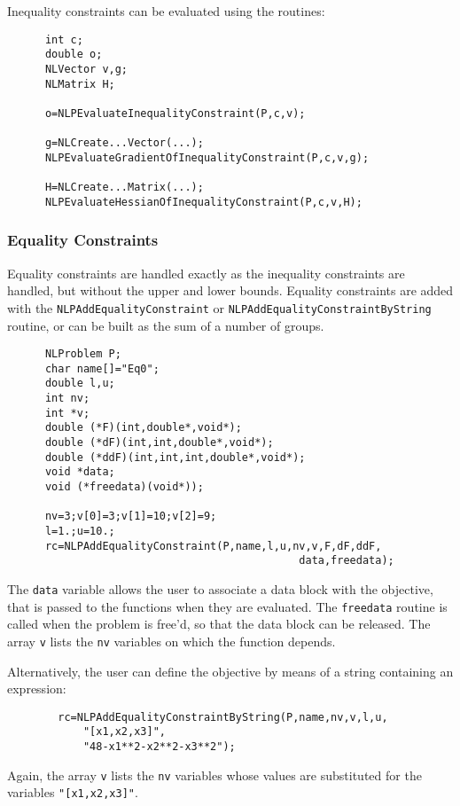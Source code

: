 \documentclass[12pt]{article}
\begin{document}
     Inequality constraints can be evaluated using the routines:
     \begin{verbatim}
      int c;
      double o;
      NLVector v,g;
      NLMatrix H;

      o=NLPEvaluateInequalityConstraint(P,c,v);

      g=NLCreate...Vector(...);
      NLPEvaluateGradientOfInequalityConstraint(P,c,v,g);

      H=NLCreate...Matrix(...);
      NLPEvaluateHessianOfInequalityConstraint(P,c,v,H);
     \end{verbatim}

   \subsubsection{Equality Constraints}
     Equality constraints are handled exactly as the inequality constraints are handled, but without the
     upper and lower bounds. Equality constraints are added with the {\tt NLPAdd\-Equality\-Constraint}
     or {\tt NLPAdd\-Equality\-Constraint\-ByString} routine, or can be built as the sum of a number of groups.
     \begin{verbatim}
      NLProblem P;
      char name[]="Eq0";
      double l,u;
      int nv;
      int *v;
      double (*F)(int,double*,void*);
      double (*dF)(int,int,double*,void*);
      double (*ddF)(int,int,int,double*,void*);
      void *data;
      void (*freedata)(void*));

      nv=3;v[0]=3;v[1]=10;v[2]=9;
      l=1.;u=10.;
      rc=NLPAddEqualityConstraint(P,name,l,u,nv,v,F,dF,ddF,
                                              data,freedata);

     \end{verbatim}
     The {\tt data} variable allows the user to associate a data block with the objective, that is passed to the
     functions when they are evaluated. The {\tt freedata} routine is called when the problem is free'd, so that
     the data block can be released. The array {\tt v} lists the {\tt nv} variables on which the function depends.

     Alternatively, the user can define the objective by means of a string containing an expression:
     \begin{verbatim}
        rc=NLPAddEqualityConstraintByString(P,name,nv,v,l,u,
            "[x1,x2,x3]",
            "48-x1**2-x2**2-x3**2");
     \end{verbatim}
     Again, the array {\tt v} lists the {\tt nv} variables whose values are substituted for the variables
     {\tt "[x1,x2,x3]"}.
\end{document}
